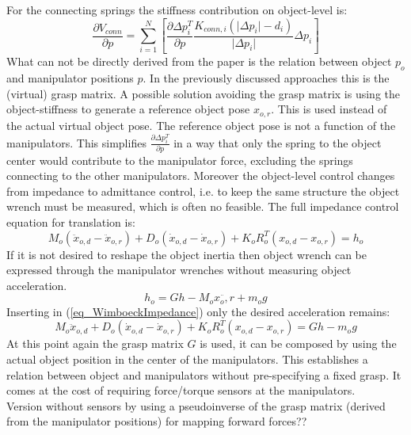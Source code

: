 \documentclass[conference]{IEEEtran}
\begin{document}
For the connecting springs the stiffness contribution on object-level is: 
\begin{equation}
\dfrac{\partial V_{conn}}{\partial p} = \sum_{i=1}^N\left[\dfrac{\partial\Delta p_i^T}{\partial p}\dfrac{K_{conn,i}(\vert\Delta p_i\vert - d_i)}{\vert\Delta p_i\vert}\Delta p_i\right] 
\end{equation}
What can not be directly derived from the paper is the relation between object $ p_o $ and manipulator positions $ p $. In the previously discussed approaches this is the (virtual) grasp matrix. A possible solution avoiding the grasp matrix is using the object-stiffness to generate a reference object pose $ x_{o,r} $. This is used instead of the actual virtual object pose. The reference object pose is not a function of the manipulators. This simplifies $ \frac{\partial\Delta p_i^T}{\partial p} $ in a way that only the spring to the object center would contribute to the manipulator force, excluding the springs connecting to the other manipulators. Moreover the object-level control changes from impedance to admittance control, i.e. to keep the same structure the object wrench must be measured, which is often no feasible.  The full impedance control equation for translation is:
\begin{equation}
M_{o}(\ddot{x}_{o,d}-\ddot{x}_{o,r}) + D_{o}(\dot{x}_{o,d}-\dot{x}_{o,r}) + K_{o} R_o^T(x_{o,d}-x_{o,r}) = h_{o}
\label{eq_WimboeckImpedance}
\end{equation}
If it is not desired to reshape the object inertia then object wrench can be expressed through the manipulator wrenches without measuring object acceleration.
\begin{equation}
h_{o} = Gh - M_o\ddot{x_o,r} + m_og
\end{equation}
Inserting in (\ref{eq_WimboeckImpedance}) only the desired acceleration remains:
\begin{equation}
M_{o}\ddot{x}_{o,d} + D_{o}(\dot{x}_{o,d}-\dot{x}_{o,r}) + K_{o} R_o^T(x_{o,d}-x_{o,r}) = Gh - m_og
\end{equation}
At this point again the grasp matrix $ G $ is used, it can be composed by using the actual object position in the center of the manipulators. This establishes a relation between object and manipulators without pre-specifying a fixed grasp. It comes at the cost of requiring force/torque sensors at the manipulators.\\
Version without sensors by using a pseudoinverse of the grasp matrix (derived from the manipulator positions) for mapping forward forces??
  
\end{document}
